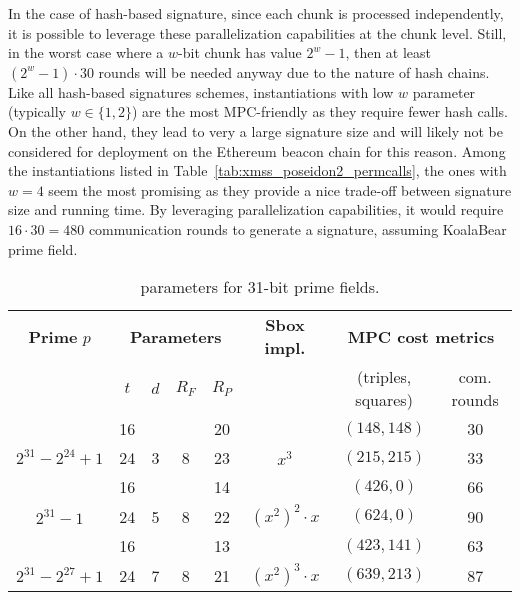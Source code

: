 In the case of hash-based signature, since each chunk is processed independently, it is possible to leverage these parallelization capabilities at the chunk level.
Still, in the worst case where a $w$-bit chunk has value $2^w-1$, then at least $(2^w-1) \cdot 30$ rounds will be needed anyway due to the nature of hash chains.
Like all hash-based signatures schemes, instantiations with low $w$ parameter (typically $w \in \{1,2\}$) are the most MPC-friendly as they require fewer hash calls.
On the other hand, they lead to very a large signature size and will likely not be considered for deployment on the Ethereum beacon chain for this reason.
Among the instantiations listed in Table~\ref{tab:xmss_poseidon2_permcalls}, the ones with $w=4$ seem the most promising as they provide a nice trade-off between signature size and running time.
By leveraging parallelization capabilities, it would require $16 \cdot 30 = 480$ communication rounds to generate a signature, assuming KoalaBear prime field.

\renewcommand\arraystretch{1.25}
\begin{table}[t]
	\centering
	\begin{tabular}{cccccccc}
		\toprule
    		\textbf{Prime} $p$ & \multicolumn{4}{c}{\textbf{Parameters}} & \textbf{Sbox impl.} & \multicolumn{2}{c}{\textbf{MPC cost metrics}}\\
    		 & {$t$} & {$d$} & {$R_F$} & {$R_P$} & & (triples, squares) & com. rounds\\
    		\midrule
   
    		& 16 &  & & 20 &  & $(148, 148)$ & 30 \\
    		\multirow{-2}{*}{$2^{31}-2^{24}+1$} & 24 & \multirow{-2}{*}{3} & \multirow{-2}{*}{8} & 23 &  \multirow{-2}{*}{$x^3$} & $(215, 215)$ & 33\\
    		\midrule
    		& 16 &  &  & 14 & & $(426, 0)$ & 66 \\
    		\multirow{-2}{*}{$2^{31}-1$} & 24 & \multirow{-2}{*}{5} & \multirow{-2}{*}{8} & 22 &  \multirow{-2}{*}{$(x^2)^2 \cdot x$} & $(624, 0)$ & 90\\
    		\midrule
    		& 16 & & & 13 &  & $(423, 141)$ & 63\\
    		\multirow{-2}{*}{$2^{31}-2^{27} + 1$}  & 24  & \multirow{-2}{*}{7} & \multirow{-2}{*}{8} & 21 &  \multirow{-2}{*}{$(x^2)^3 \cdot x$ }  & $(639, 213)$  & 87\\
    		\bottomrule
	\end{tabular}
	\caption{\PoseidonTwoPi parameters for 31-bit prime fields.\label{tab:poseidon2_inst31}}
\end{table}


